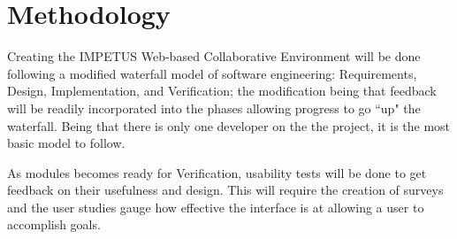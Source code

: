 \section{Methodology}

Creating the IMPETUS Web-based Collaborative Environment will be done following a modified waterfall model of software engineering: Requirements, Design, Implementation, and Verification; the modification being that feedback will be readily incorporated into the phases allowing progress to go ``up" the waterfall. Being that there is only one developer on the the project, it is the most basic model to follow.

As modules becomes ready for Verification, usability tests will be done to get feedback on their usefulness and design. This will require the creation of surveys and the user studies gauge how effective the interface is at allowing a user to accomplish goals.
































